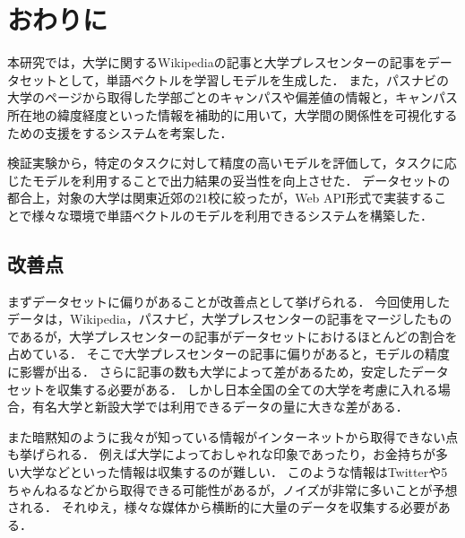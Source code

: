 \chapter{おわりに}
本研究では，大学に関するWikipediaの記事と大学プレスセンターの記事をデータセットとして，単語ベクトルを学習しモデルを生成した．
また，パスナビの大学のページから取得した学部ごとのキャンパスや偏差値の情報と，キャンパス所在地の緯度経度といった情報を補助的に用いて，大学間の関係性を可視化するための支援をするシステムを考案した．

検証実験から，特定のタスクに対して精度の高いモデルを評価して，タスクに応じたモデルを利用することで出力結果の妥当性を向上させた．
データセットの都合上，対象の大学は関東近郊の21校に絞ったが，Web API形式で実装することで様々な環境で単語ベクトルのモデルを利用できるシステムを構築した．

\section{改善点}
まずデータセットに偏りがあることが改善点として挙げられる．
今回使用したデータは，Wikipedia，パスナビ，大学プレスセンターの記事をマージしたものであるが，大学プレスセンターの記事がデータセットにおけるほとんどの割合を占めている．
そこで大学プレスセンターの記事に偏りがあると，モデルの精度に影響が出る．
さらに記事の数も大学によって差があるため，安定したデータセットを収集する必要がある．
しかし日本全国の全ての大学を考慮に入れる場合，有名大学と新設大学では利用できるデータの量に大きな差がある．

また暗黙知のように我々が知っている情報がインターネットから取得できない点も挙げられる．
例えば大学によっておしゃれな印象であったり，お金持ちが多い大学などといった情報は収集するのが難しい．
このような情報はTwitterや5ちゃんねるなどから取得できる可能性があるが，ノイズが非常に多いことが予想される．
それゆえ，様々な媒体から横断的に大量のデータを収集する必要がある．
